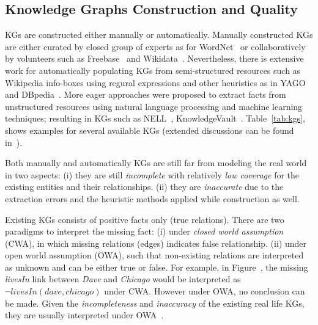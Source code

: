 
\subsection{Knowledge Graphs Construction and Quality}
KGs are constructed either manually or automatically. Manually constructed KGs are either curated by closed group of experts as for WordNet~\cite{wordnet} or collaboratively by volunteers such as \eg Freebase~\cite{Freebase} and Wikidata~\cite{wikidata}.  Nevertheless, there is extensive work for automatically populating KGs from semi-structured resources such as Wikipedia info-boxes using regural expressions and other heuristics as in YAGO~\cite{yago} and DBpedia~\cite{dbpedia}. More eager approaches were proposed to extract facts from unstructured resources using natural language processing and machine learning techniques; resulting in KGs such as  NELL~\cite{nell}, KnowledgeVault~\cite{KnowledgeVault}. Table~\ref{tab:kgs}, shows examples for several available KGs (extended discussions can be found in~\cite{Nickel2015ARO,DBLP:journals/semweb/Paulheim17}).


Both manually and automatically KGs are still far from modeling the real world in two aspects: (i) they are still \textit{incomplete} with relatively \textit{low coverage} for the existing entities and their relationships. (ii) they are \textit{inaccurate} due to the extraction errors and the heuristic methods applied while construction as well.  




Existing KGs consists of positive facts only (\ie true relations). There are two paradigms to interpret the missing fact: (i) under \textit{closed world assumption} (CWA), in which missing relations (\ie edges) indicates false relationship. (ii) under open world assumption (OWA), such that non-existing relations are interpreted as unknown and can be either true or false. For example, in Figure~\cite{rdf}, the missing \textit{livesIn} link between \textit{Dave} and \textit{Chicago} would be interpreted as $\neg livesIn(dave, chicago)$ under CWA. However under OWA, no conclusion can be made. Given the \textit{incompleteness} and \textit{inaccuracy} of the existing real life KGs, they are usually interpreted under OWA~\cite{Nickel2015ARO}. 


